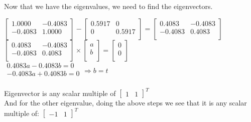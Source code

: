 \documentclass[12pt]{article}
\begin{document}
\noindent
Now that we have the eigenvalues, we need to find the eigenvectors.
\begin{center}
    
    $
    \begin{bmatrix}
        1.0000 & -0.4083 \\
        -0.4083 & 1.0000 \\
    \end{bmatrix}
    -
    \begin{bmatrix}
        0.5917 & 0 \\
        0 & 0.5917 \\
    \end{bmatrix}
    =
    \begin{bmatrix}
        0.4083 & -0.4083 \\
        -0.4083 & 0.4083 \\
    \end{bmatrix}
    $
    \\[0.1 in]
    $
    \begin{bmatrix}
        0.4083 & -0.4083 \\
        -0.4083 & 0.4083 \\
    \end{bmatrix}
    \times
    \begin{bmatrix}
        a \\
        b \\
    \end{bmatrix}
    =
    \begin{bmatrix}
        0 \\
        0 \\
    \end{bmatrix}
    $
    \\[0.1 in]
    $
    \begin{matrix}
        0.4083a - 0.4083b = 0\\
        -0.4083a + 0.4083b = 0 \\
    \end{matrix}
    \Rightarrow b=t
    $
    \\[0.1 in]
\end{center}
Eigenvector is any scalar multiple of
$
\begin{bmatrix}
    1 & 1
\end{bmatrix}
^T
$
\\[0.1 in]
And for the other eigenvalue, doing the above steps we see that it is any scalar multiple of:
$
\begin{bmatrix}
    -1 & 1
\end{bmatrix}
^T
$
\par
\end{document}
